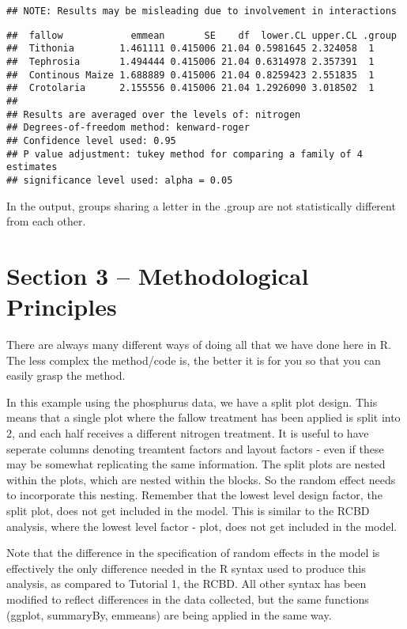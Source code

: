 \documentclass[]{book}
\theoremstyle{definition}
\theoremstyle{definition}
\theoremstyle{definition}
\theoremstyle{remark}
\begin{document}
\begin{verbatim}
## NOTE: Results may be misleading due to involvement in interactions
\end{verbatim}

\begin{verbatim}
##  fallow            emmean       SE    df  lower.CL upper.CL .group
##  Tithonia        1.461111 0.415006 21.04 0.5981645 2.324058  1    
##  Tephrosia       1.494444 0.415006 21.04 0.6314978 2.357391  1    
##  Continous Maize 1.688889 0.415006 21.04 0.8259423 2.551835  1    
##  Crotolaria      2.155556 0.415006 21.04 1.2926090 3.018502  1    
## 
## Results are averaged over the levels of: nitrogen 
## Degrees-of-freedom method: kenward-roger 
## Confidence level used: 0.95 
## P value adjustment: tukey method for comparing a family of 4 estimates 
## significance level used: alpha = 0.05
\end{verbatim}

In the output, groups sharing a letter in the .group are not
statistically different from each other.

\section{Section 3 -- Methodological
Principles}\label{section-3-methodological-principles-1}

There are always many different ways of doing all that we have done here
in R. The less complex the method/code is, the better it is for you so
that you can easily grasp the method.

In this example using the phosphurus data, we have a split plot design.
This means that a single plot where the fallow treatment has been
applied is split into 2, and each half receives a different nitrogen
treatment. It is useful to have seperate columns denoting treamtent
factors and layout factors - even if these may be somewhat replicating
the same information. The split plots are nested within the plots, which
are nested within the blocks. So the random effect needs to incorporate
this nesting. Remember that the lowest level design factor, the split
plot, does not get included in the model. This is similar to the RCBD
analysis, where the lowest level factor - plot, does not get included in
the model.

Note that the difference in the specification of random effects in the
model is effectively the only difference needed in the R syntax used to
produce this analysis, as compared to Tutorial 1, the RCBD. All other
syntax has been modified to reflect differences in the data collected,
but the same functions (ggplot, summaryBy, emmeans) are being applied in
the same way.
\end{document}
